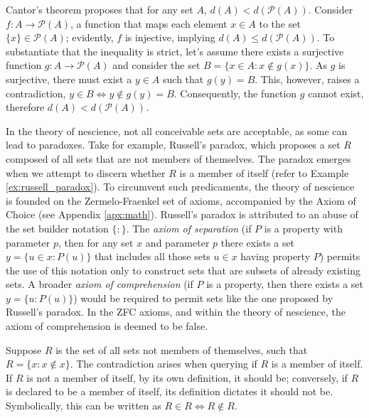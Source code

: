 \begin{example}
\label{cantor_theorem}
Cantor's theorem proposes that for any set $A$, $d(A) < d\left(\mathcal{P}(A)\right)$. Consider $f: A \rightarrow \mathcal{P}(A)$, a function that maps each element $x \in A$ to the set $\{x\} \in \mathcal{P}(A)$; evidently, $f$ is injective, implying $d(A) \leq d\left(\mathcal{P}(A)\right)$. To substantiate that the inequality is strict, let's assume there exists a surjective function $g: A \rightarrow \mathcal{P}(A)$ and consider the set $B = \{ x \in A : x \notin g(x) \}$. As $g$ is surjective, there must exist a $y \in A$ such that $g(y) = B$. This, however, raises a contradiction, $y \in B \Leftrightarrow y \notin g(y) = B$. Consequently, the function $g$ cannot exist, therefore $d(A) < d\left(\mathcal{P}(A)\right)$.
\end{example}

In the theory of nescience, not all conceivable sets are acceptable, as some can lead to paradoxes. Take for example, Russell's paradox, which proposes a set $R$ composed of all sets that are not members of themselves. The paradox emerges when we attempt to discern whether $R$ is a member of itself (refer to Example \ref{ex:russell_paradox}). To circumvent such predicaments, the theory of nescience is founded on the Zermelo-Fraenkel set of axioms, accompanied by the Axiom of Choice (see Appendix \ref{apx:math}). Russell's paradox is attributed to an abuse of the set builder notation $\{ : \}$. The \emph{axiom of separation} (if $P$ is a property with parameter $p$, then for any set $x$ and parameter $p$ there exists a set $y=\{u \in x : P(u) \}$ that includes all those sets $u \in x$ having property $P$) permits the use of this notation only to construct sets that are subsets of already existing sets. A broader \emph{axiom of comprehension} (if $P$ is a property, then there exists a set $y=\{u : P(u) \}$) would be required to permit sets like the one proposed by Russell's paradox. In the ZFC axioms, and within the theory of nescience, the axiom of comprehension is deemed to be false.

\begin{example}
\label{ex:russell_paradox}
Suppose $R$ is the set of all sets not members of themselves, such that $R = \{ x : x \notin x \}$. The contradiction arises when querying if $R$ is a member of itself. If $R$ is not a member of itself, by its own definition, it should be; conversely, if $R$ is declared to be a member of itself, its definition dictates it should not be. Symbolically, this can be written as $R \in R \Leftrightarrow R \notin R$.
\end{example}

